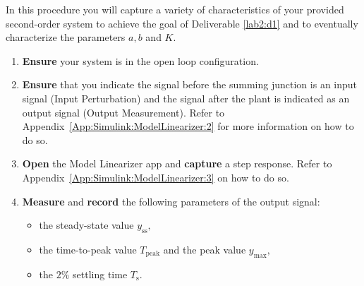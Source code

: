 \begin{procedure}[label={proc:lab2:p1}]
  In this procedure you will capture a variety of characteristics of
  your provided second-order system to achieve the goal of Deliverable
  \ref{lab2:d1} and to eventually characterize the parameters \(a,\)\(b\)
  and \(K.\)
  \begin{enumerate}[label=(\arabic*)]
    \item{
      \textbf{Ensure} your system is in the open loop configuration.
    }
    \item{
      \textbf{Ensure} that you indicate the signal before the summing junction
      is an input signal (Input Perturbation) and the signal after the plant
      is indicated as an output signal (Output Measurement). Refer
      to Appendix~\ref{App:Simulink:ModelLinearizer:2} for more information
      on how to do so.
    }
    \item{
      \textbf{Open} the Model Linearizer app and \textbf{capture} a
      step response. Refer to Appendix~\ref{App:Simulink:ModelLinearizer:3}
      on how to do so.
    }
    \item{
      \textbf{Measure} and \textbf{record} the following parameters of the
      output signal:
      \begin{itemize}
        \item{
          the steady-state value \(y_{\mathrm{ss}},\)
        }
        \item{
          the time-to-peak value \(T_{\mathrm{peak}}\) and
          the peak value \(y_{\mathrm{max}},\)
        }
        \item{
          the \(2\%\) settling time \(T_{\mathrm{s}}.\)
        }
      \end{itemize}
      \label{proc:lab2:p1:4}
    }
  \end{enumerate}
\end{procedure}

